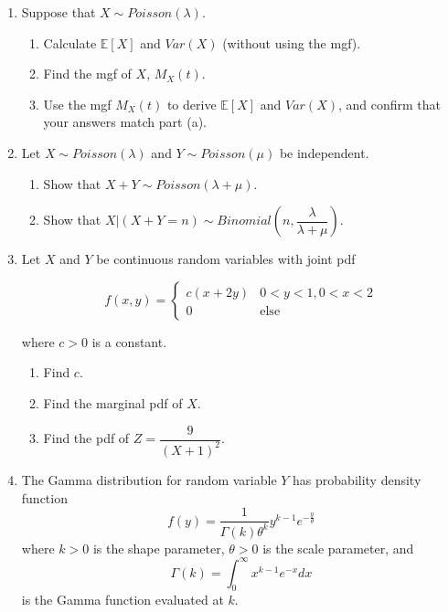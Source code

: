 \documentclass[11pt]{article}
\begin{document}
\begin{enumerate}

\item Suppose that $X \sim Poisson(\lambda)$.

\begin{enumerate}
\item Calculate $\mathbb{E}[X]$ and $Var(X)$ (without using the mgf).

\item Find the mgf of $X$, $M_X(t)$.

\item Use the mgf $M_X(t)$ to derive $\mathbb{E}[X]$ and $Var(X)$, and confirm that your answers match part (a).
\end{enumerate}

\item Let $X \sim Poisson(\lambda)$ and $Y \sim Poisson(\mu)$ be independent.

\begin{enumerate}
\item Show that $X + Y \sim Poisson(\lambda + \mu)$.

\item Show that $X | (X + Y = n) \sim Binomial\left(n, \dfrac{\lambda}{\lambda + \mu} \right)$.
\end{enumerate}

\item Let $X$ and $Y$ be continuous random variables with joint pdf

$$f(x,y) = \begin{cases} 
c(x + 2y) & 0 < y < 1, 0 < x < 2 \\
0 & \text{else}
\end{cases}$$

where $c > 0$ is a constant.

\begin{enumerate}
\item Find $c$.

\item Find the marginal pdf of $X$.

\item Find the pdf of $Z = \dfrac{9}{(X + 1)^2}$.
\end{enumerate}

\item The Gamma distribution for random variable $Y$ has probability density function
\[
f(y) = \frac{1}{\Gamma(k)\theta^k}y^{k-1} e^{-\frac{y}{\theta}}
\]
where $k > 0$ is the shape parameter, $\theta > 0$ is the scale parameter, and 
\[
\Gamma(k) = \int_0^\infty x^{k-1} e^{-x} dx
\]
is the Gamma function evaluated at $k$.


\end{enumerate}
\end{document}
